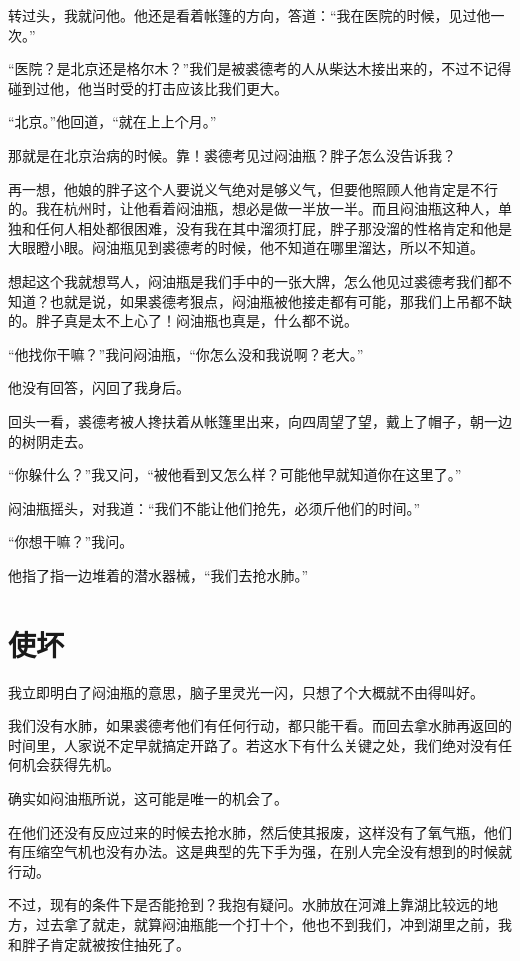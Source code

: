 转过头，我就问他。他还是看着帐篷的方向，答道：“我在医院的时候，见过他一次。”

“医院？是北京还是格尔木？”我们是被裘德考的人从柴达木接出来的，不过不记得碰到过他，他当时受的打击应该比我们更大。

“北京。”他回道，“就在上上个月。”

那就是在北京治病的时候。靠！裘德考见过闷油瓶？胖子怎么没告诉我？

再一想，他娘的胖子这个人要说义气绝对是够义气，但要他照顾人他肯定是不行的。我在杭州时，让他看着闷油瓶，想必是做一半放一半。而且闷油瓶这种人，单独和任何人相处都很困难，没有我在其中溜须打屁，胖子那没溜的性格肯定和他是大眼瞪小眼。闷油瓶见到裘德考的时候，他不知道在哪里溜达，所以不知道。

想起这个我就想骂人，闷油瓶是我们手中的一张大牌，怎么他见过裘德考我们都不知道？也就是说，如果裘德考狠点，闷油瓶被他接走都有可能，那我们上吊都不缺的。胖子真是太不上心了！闷油瓶也真是，什么都不说。

“他找你干嘛？”我问闷油瓶，“你怎么没和我说啊？老大。”

他没有回答，闪回了我身后。

回头一看，裘德考被人搀扶着从帐篷里出来，向四周望了望，戴上了帽子，朝一边的树阴走去。

“你躲什么？”我又问，“被他看到又怎么样？可能他早就知道你在这里了。”

闷油瓶摇头，对我道：“我们不能让他们抢先，必须斤他们的时间。”

“你想干嘛？”我问。

他指了指一边堆着的潜水器械，“我们去抢水肺。”

\chapter{使坏}

我立即明白了闷油瓶的意思，脑子里灵光一闪，只想了个大概就不由得叫好。

我们没有水肺，如果裘德考他们有任何行动，都只能干看。而回去拿水肺再返回的时间里，人家说不定早就搞定开路了。若这水下有什么关键之处，我们绝对没有任何机会获得先机。

确实如闷油瓶所说，这可能是唯一的机会了。

在他们还没有反应过来的时候去抢水肺，然后使其报废，这样没有了氧气瓶，他们有压缩空气机也没有办法。这是典型的先下手为强，在别人完全没有想到的时候就行动。

不过，现有的条件下是否能抢到？我抱有疑问。水肺放在河滩上靠湖比较远的地方，过去拿了就走，就算闷油瓶能一个打十个，他也不到我们，冲到湖里之前，我和胖子肯定就被按住抽死了。

